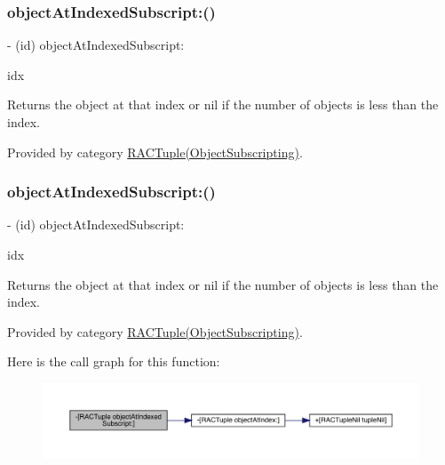 \subsubsection{\texorpdfstring{object\+At\+Indexed\+Subscript\+:()}{objectAtIndexedSubscript:()}\hspace{0.1cm}{\footnotesize\ttfamily [1/3]}}
{\footnotesize\ttfamily -\/ (id) object\+At\+Indexed\+Subscript\+: \begin{DoxyParamCaption}\item[{(N\+S\+U\+Integer)}]{idx }\end{DoxyParamCaption}}

Returns the object at that index or nil if the number of objects is less than the index. 

Provided by category \mbox{\hyperlink{category_r_a_c_tuple_07_object_subscripting_08_ad2360332f752318fc924727c17eb67c9}{R\+A\+C\+Tuple(\+Object\+Subscripting)}}.

\mbox{\label{interface_r_a_c_tuple_ad2360332f752318fc924727c17eb67c9}} 
\subsubsection{\texorpdfstring{object\+At\+Indexed\+Subscript\+:()}{objectAtIndexedSubscript:()}\hspace{0.1cm}{\footnotesize\ttfamily [2/3]}}
{\footnotesize\ttfamily -\/ (id) object\+At\+Indexed\+Subscript\+: \begin{DoxyParamCaption}\item[{(N\+S\+U\+Integer)}]{idx }\end{DoxyParamCaption}}

Returns the object at that index or nil if the number of objects is less than the index. 

Provided by category \mbox{\hyperlink{category_r_a_c_tuple_07_object_subscripting_08_ad2360332f752318fc924727c17eb67c9}{R\+A\+C\+Tuple(\+Object\+Subscripting)}}.

Here is the call graph for this function\+:\nopagebreak
\begin{figure}[H]
\begin{center}
\leavevmode
\includegraphics[width=350pt]{interface_r_a_c_tuple_ad2360332f752318fc924727c17eb67c9_cgraph}
\end{center}
\end{figure}
\mbox{\label{interface_r_a_c_tuple_ad2360332f752318fc924727c17eb67c9}} 
